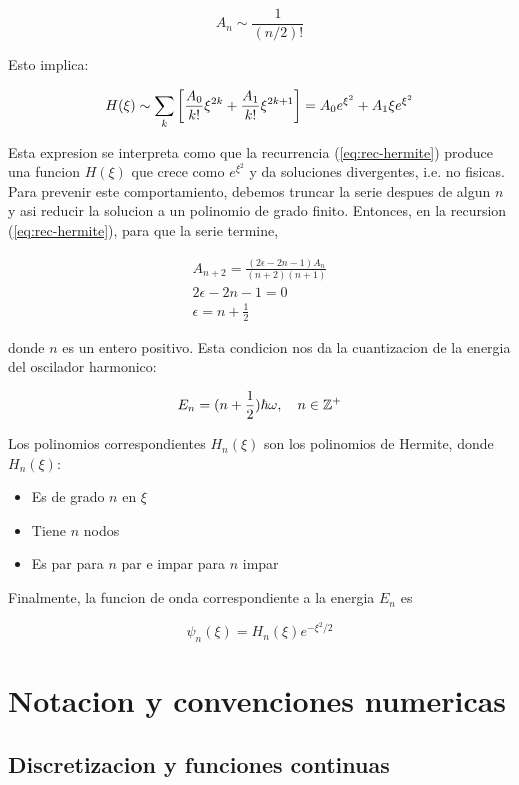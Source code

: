 \documentclass[11pt]{article}
\begin{document}
\[ A_n \sim \frac{1}{(n/2)!} \]

Esto implica:

\[ H(\xi) \sim \sum_k \qty[\frac{A_0}{k!}\xi^{2k} + \frac{A_1}{k!}\xi^{2k+1}] = A_0e^{\xi^2} + A_1\xi e^{\xi^2} \]

Esta expresion se interpreta como que la recurrencia (\ref{eq:rec-hermite}) produce una funcion \(H(\xi)\) que crece como \(e^{\xi^2}\) y da soluciones divergentes, i.e. no fisicas. Para prevenir este comportamiento, debemos truncar la serie despues de algun \(n\) y asi reducir la solucion a un polinomio de grado finito. Entonces, en la recursion (\ref{eq:rec-hermite}), para que la serie termine,

\begin{gather*}
      A_{n+2} = \frac{(2\epsilon - 2n -1)A_n}{(n+2)(n+1)} \\
      2\epsilon - 2n -1 = 0 \\
      \epsilon = n + \frac{1}{2}
\end{gather*}

donde \(n\) es un entero positivo. Esta condicion nos da la cuantizacion de la energia del oscilador harmonico:

\begin{equation}
\label{eq:ho-energy}
    E_n = (n+\frac{1}{2})\hbar \omega \qc n \in \mathbb{Z}^+
\end{equation}

Los polinomios correspondientes \(H_n(\xi)\) son los polinomios de Hermite, donde \(H_n(\xi)\):

\begin{itemize}
\item Es de grado \(n\) en \(\xi\)

\item Tiene \(n\) nodos

\item Es par para \(n\) par e impar para \(n\) impar
\end{itemize}

Finalmente, la funcion de onda correspondiente a la energia \(E_n\) es

\[ \psi_n(\xi) = H_n(\xi)e^{-\xi^2/2} \]
\section{Notacion y convenciones numericas}
\label{sec:org1db1dbd}

\subsection{Discretizacion y funciones continuas}
\label{sec:org2c1a08d}
\end{document}
